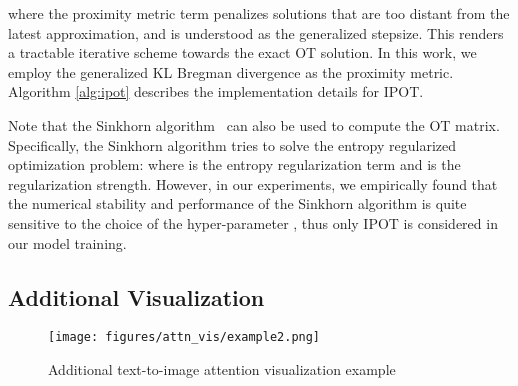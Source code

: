 \documentclass[runningheads]{llncs}
\begin{document}
where the proximity metric term  penalizes solutions that are too distant from the latest approximation, and  is understood as the generalized stepsize. This renders a tractable iterative scheme towards the exact OT solution. In this work, we employ the generalized KL Bregman divergence
 as  the proximity metric. 
Algorithm \ref{alg:ipot} describes the implementation details for IPOT.



Note that the Sinkhorn algorithm~\cite{cuturi2013sinkhorn} can also be used to compute the OT matrix. Specifically, the Sinkhorn algorithm tries to solve the entropy regularized optimization problem:  where  is the entropy regularization term and  is the regularization strength. However, in our experiments, we empirically found that the numerical stability and performance of the Sinkhorn algorithm is quite sensitive to the choice of the hyper-parameter , thus only IPOT is considered in our model training.


\subsection{Additional Visualization} \label{sec:addtional_viz}

\begin{figure*}[!h]
  \texttt{[image: figures/attn\_vis/example2.png]}
 \caption{\small{Additional text-to-image attention visualization example}}
  \label{fig:vis2}
\end{figure*} 

  
\end{document}
